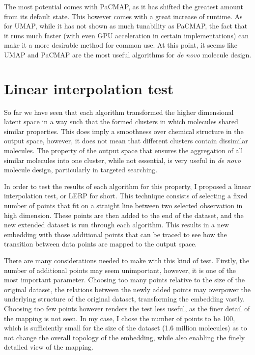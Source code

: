 The most potential comes with PaCMAP, as it has shifted the greatest amount from its default state. This however comes with a great increase of runtime. As for UMAP, while it has not shown as much tunability as PaCMAP, the fact that it runs much faster (with even GPU acceleration in certain implementations) can make it a more desirable method for common use. At this point, it seems like UMAP and PaCMAP are the most useful algorithms for \textit{de novo} molecule design.

\section{Linear interpolation test}\label{sec:linear-interpolation-test}

So far we have seen that each algorithm transformed the higher dimensional latent space in a way such that the formed clusters in which molecules shared similar properties. This does imply a smoothness over chemical structure in the output space, however, it does not mean that different clusters contain dissimilar molecules. The property of the output space that ensures the aggregation of all similar molecules into one cluster, while not essential, is very useful in \textit{de novo} molecule design, particularly in targeted searching.

In order to test the results of each algorithm for this property, I proposed a linear interpolation test, or LERP for short. This technique consists of selecting a fixed number of points that fit on a straight line between two selected observation in high dimension. These points are then added to the end of the dataset, and the new extended dataset is run through each algorithm. This results in a new embedding with those additional points that can be traced to see how the transition between data points are mapped to the output space.

There are many considerations needed to make with this kind of test. Firstly, the number of additional points may seem unimportant, however, it is one of the most important parameter. Choosing too many points relative to the size of the original dataset, the relations between the newly added points may overpower the underlying structure of the original dataset, transforming the embedding vastly. Choosing too few points however renders the test less useful, as the finer detail of the mapping is not seen. In my case, I chose the number of points to be 100, which is sufficiently small for the size of the dataset (1.6 million molecules) as to not change the overall topology of the embedding, while also enabling the finely detailed view of the mapping.

